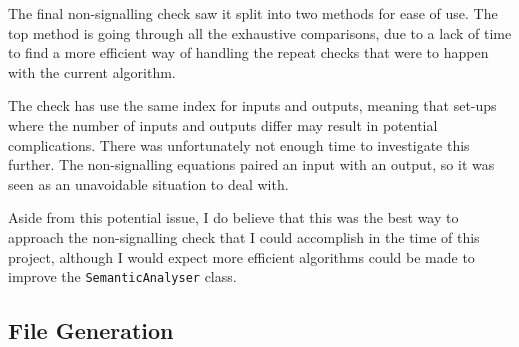 \documentclass[report.tex]{subfiles}
\begin{document}


The final non-signalling check saw it split into two methods for ease of use.
The top method is going through all the exhaustive comparisons, due to a lack of
time to find a more efficient way of handling the repeat checks that were to
happen with the current algorithm. 

The check has use the same index for inputs and outputs, meaning that set-ups
where the number of inputs and outputs differ may result in potential
complications. There was unfortunately not enough time to investigate this
further. The non-signalling equations paired an input with an output, so it was
seen as an unavoidable situation to deal with.

Aside from this potential issue, I do believe that this was the best way to
approach the non-signalling check that I could accomplish in the time of this
project, although I would expect more efficient algorithms could be made to
improve the \texttt{SemanticAnalyser} class.

\subsection{File Generation} %
\label{sub:file_generation}

\newpage
\end{document}

